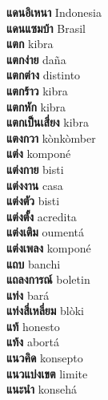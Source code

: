 \textbf{ แดนอิเหนา  } Indonesia \\
\textbf{ แดนแซมบ้า  } Brasil \\
\textbf{ แตก  } kibra \\
\textbf{ แตกง่าย  } daña \\
\textbf{ แตกต่าง  } distinto \\
\textbf{ แตกร้าว  } kibra \\
\textbf{ แตกหัก  } kibra \\
\textbf{ แตกเป็นเสี่ยง  } kibra \\
\textbf{ แตงกวา  } kònkòmber \\
\textbf{ แต่ง  } komponé \\
\textbf{ แต่งกาย  } bisti \\
\textbf{ แต่งงาน  } casa \\
\textbf{ แต่งตัว  } bisti \\
\textbf{ แต่งตั้ง  } acredita \\
\textbf{ แต่งเติม  } oumentá \\
\textbf{ แต่งเพลง  } komponé \\
\textbf{ แถบ  } banchi \\
\textbf{ แถลงการณ์  } boletin \\
\textbf{ แท่ง  } bará \\
\textbf{ แท่งสี่เหลี่ยม  } blòki \\
\textbf{ แท้  } honesto \\
\textbf{ แท้ง  } abortá \\
\textbf{ แนวคิด  } konsepto \\
\textbf{ แนวแบ่งเขต  } limite \\
\textbf{ แนะนำ  } konsehá \\
